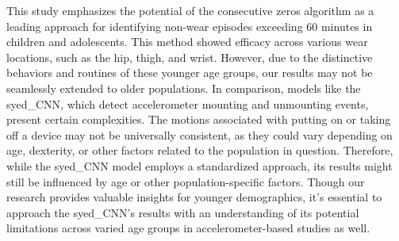 \documentclass[
  10pt,
]{scrbook}
\begin{document}
This study emphasizes the potential of the consecutive zeros algorithm
as a leading approach for identifying non-wear episodes exceeding 60
minutes in children and adolescents. This method showed efficacy across
various wear locations, such as the hip, thigh, and wrist. However, due
to the distinctive behaviors and routines of these younger age groups,
our results may not be seamlessly extended to older populations. In
comparison, models like the syed\_CNN, which detect accelerometer
mounting and unmounting events, present certain complexities. The
motions associated with putting on or taking off a device may not be
universally consistent, as they could vary depending on age, dexterity,
or other factors related to the population in question. Therefore, while
the syed\_CNN model employs a standardized approach, its results might
still be influenced by age or other population-specific factors. Though
our research provides valuable insights for younger demographics, it's
essential to approach the syed\_CNN's results with an understanding of
its potential limitations across varied age groups in
accelerometer-based studies as well.
\end{document}
